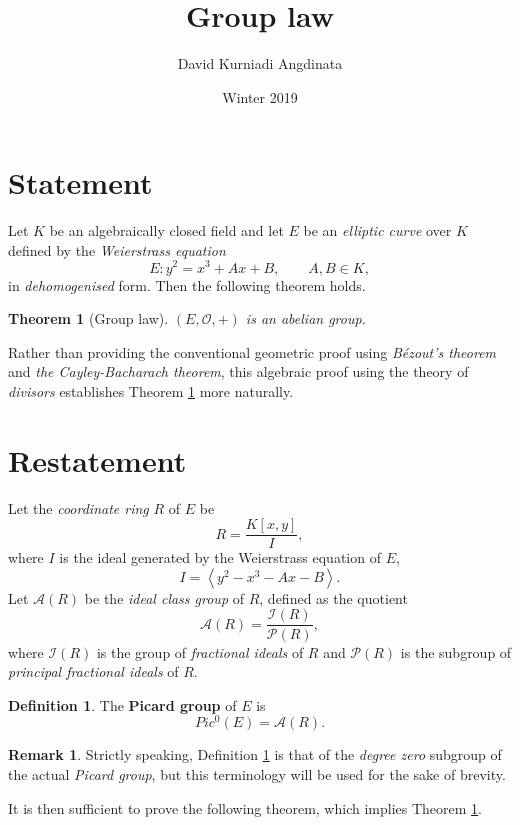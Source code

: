 \documentclass{article}
\title{Group law}
\author{David Kurniadi Angdinata}
\date{Winter 2019}
\theoremstyle{plain}
\newtheorem{theorem}[n]{Theorem}
\theoremstyle{definition}
\newtheorem{definition}[n]{Definition}
\newtheorem{remark}[n]{Remark}
\newcommand{\ab}[1]{\left\langle #1 \right\rangle}
\newcommand{\rb}[1]{\left( #1 \right)}
\renewcommand{\sb}[1]{\left[ #1 \right]}
\renewcommand{\AA}{\mathcal{A}}
\newcommand{\II}{\mathcal{I}}
\newcommand{\OO}{\mathcal{O}}
\newcommand{\PP}{\mathcal{P}}
\begin{document}
\maketitle

\section{Statement}

Let $ K $ be an algebraically closed field and let $ E $ be an \emph{elliptic curve} over $ K $ defined by the \emph{Weierstrass equation}
$$ E : y^2 = x^3 + Ax + B, \qquad A, B \in K, $$
in \emph{dehomogenised} form. Then the following theorem holds.

\begin{theorem}[Group law]
\label{thm:grouplaw}
$ \rb{E, \OO, +} $ is an abelian group.
\end{theorem}

Rather than providing the conventional geometric proof using \emph{B\'ezout's theorem} and \emph{the Cayley-Bacharach theorem}, this algebraic proof using the theory of \emph{divisors} establishes Theorem \ref{thm:grouplaw} more naturally.

\section{Restatement}

Let the \emph{coordinate ring} $ R $ of $ E $ be
$$ R = \dfrac{K\sb{x, y}}{I}, $$
where $ I $ is the ideal generated by the Weierstrass equation of $ E $,
$$ I = \ab{y^2 - x^3 - Ax - B}. $$
Let $ \AA\rb{R} $ be the \emph{ideal class group} of $ R $, defined as the quotient
$$ \AA\rb{R} = \dfrac{\II\rb{R}}{\PP\rb{R}}, $$
where $ \II\rb{R} $ is the group of \emph{fractional ideals} of $ R $ and $ \PP\rb{R} $ is the subgroup of \emph{principal fractional ideals} of $ R $.

\begin{definition}
\label{def:picard}
The \textbf{Picard group} of $ E $ is
$$ Pic^0\rb{E} = \AA\rb{R}. $$
\end{definition}

\begin{remark}
Strictly speaking, Definition \ref{def:picard} is that of the \emph{degree zero} subgroup of the actual \emph{Picard group}, but this terminology will be used for the sake of brevity.
\end{remark}

It is then sufficient to prove the following theorem, which implies Theorem \ref{thm:grouplaw}.
\end{document}
